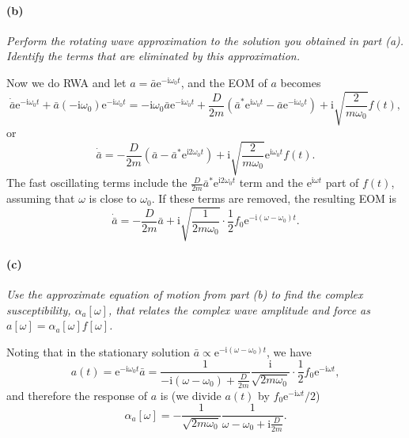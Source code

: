\documentclass[hyperref, a4paper]{article}
\newcommand*{\ii}{\mathrm{i}}
\newcommand*{\ee}{\mathrm{e}}
\begin{document}
\paragraph*{(b)} \textit{Perform the rotating wave approximation to the solution you obtained in part (a). Identify the terms that are eliminated by this approximation.} 

Now we do RWA and let $a = \bar{a} \ee^{- \ii \omega_0 t}$, 
and the EOM of $a$ becomes 
\[
    \dot{\bar{a}} \ee^{- \ii \omega_0 t} + \bar{a} (- \ii \omega_0) \ee^{- \ii \omega_0 t} 
    = - \ii \omega_0 \bar{a} \ee^{- \ii \omega_0 t} 
    + \frac{D}{2m} (\bar{a}^* \ee^{\ii \omega_0 t} - \bar{a} \ee^{- \ii \omega_0 t})
    + \ii \sqrt{\frac{2}{m \omega_0}} f(t),
\]
or 
\begin{equation}
    \dot{\bar{a}} = - \frac{D}{2m} (\bar{a} - \bar{a}^* \ee^{\ii 2 \omega_0 t}) 
    + \ii \sqrt{\frac{2}{m \omega_0}} \ee^{\ii \omega_0 t} f(t).
\end{equation}
The fast oscillating terms include the $\frac{D}{2m} \bar{a}^* \ee^{\ii 2 \omega_0 t}$ term
and the $\ee^{\ii \omega t}$ part of $f(t)$, 
assuming that $\omega$ is close to $\omega_0$.
If these terms are removed, the resulting EOM is 
\begin{equation}
    \dot{\bar{a}} = - \frac{D}{2m} \bar{a} 
    + \ii \sqrt{\frac{1}{2 m \omega_0}} \cdot \frac{1}{2} f_0 \ee^{- \ii (\omega - \omega_0) t}. 
\end{equation}

\paragraph*{(c)} \textit{Use the approximate equation of motion from part (b) to find the complex susceptibility, $\alpha_a[\omega]$, that relates the complex wave amplitude and force as $a[\omega]=\alpha_a[\omega] f[\omega]$.} 

Noting that in the stationary solution $\bar{a} \propto \ee^{- \ii (\omega - \omega_0) t}$, 
we have 
\begin{equation}
    a(t) = \ee^{- \ii \omega_0 t} \bar{a} = 
    \frac{1}{- \ii(\omega - \omega_0) + \frac{D}{2m}} \frac{\ii}{\sqrt{2 m \omega_0}} \cdot \frac{1}{2} f_0 
    \ee^{- \ii \omega t}, 
\end{equation}
and therefore the response of $a$ is (we divide $a(t)$ by $f_0 \ee^{- \ii \omega t}/2$)
\begin{equation}
    \alpha_a[\omega] = - \frac{1}{\sqrt{2 m \omega_0}} \frac{1}{\omega - \omega_0 + \ii \frac{D}{2m}}.
\end{equation} 
\end{document}
